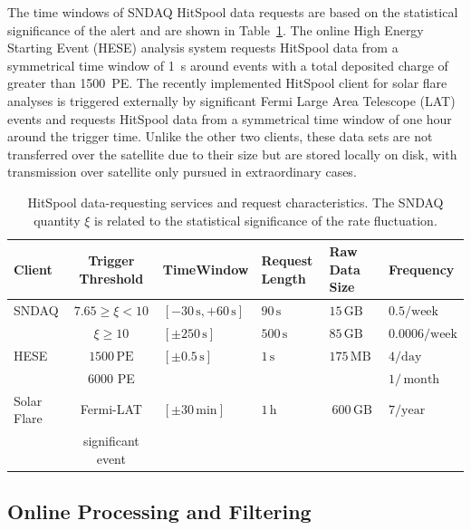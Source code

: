 The time windows of SNDAQ HitSpool data requests are based on the
statistical significance of the alert and are shown in
Table~\ref{tab:hsclients}. The online High Energy Starting Event (HESE) 
analysis system requests HitSpool data from a symmetrical time window of
1~s around events with a total deposited charge of greater than 1500~PE.
The recently implemented HitSpool client for solar flare analyses is
triggered externally by significant Fermi Large Area Telescope (LAT) events
and requests HitSpool 
data from a symmetrical time window of one hour around the trigger
time. Unlike the other two clients, these data sets are not transferred
over the satellite due to their size but are stored locally on disk, with
transmission over satellite only pursued in extraordinary cases.

\begin{table}
  \caption{HitSpool data-requesting services and request characteristics.
    The SNDAQ quantity $\xi$ is related to the statistical significance of
    the rate fluctuation.}
  \centering
  \footnotesize
\begin{tabularx}{\textwidth}{lcXXXX}
  \toprule Client & Trigger Threshold & Time\newline Window & Request
  Length & Raw \newline Data Size & Frequency \\
  \midrule
  SNDAQ & $7.65 \ge \xi < 10$  & $[-30\,\mathrm{s},+60\,\mathrm{s}]$ &
  $90 \,\mathrm{s}$& $15 \,\mathrm{GB}$&
  $0.5/\mathrm{week}$ \\
   & $\xi \ge 10$ &  $[\pm250\,\mathrm{s}]$ & $500\,\mathrm{s}$ & $85
  \,\mathrm{GB}$ & $0.0006 / \mathrm{week}$ \\
  HESE & $1500 \,\mathrm{PE} $ &
  $[\pm0.5\,\mathrm{s}]$& $1\,\mathrm{s}$ & $175\,\mathrm{MB}$ &
  $4/\mathrm{day}$ \\
   & 6000 PE & & & & $1/\,\mathrm{month}$ \\ 
  Solar Flare & Fermi-LAT & $[\pm30\,\mathrm{min}]$ & $1\,\mathrm{h}$&
  $~600\,\mathrm{GB}$& $ 7 / \mathrm{year}$ \\
  & significant event & & & & 
  \\ \bottomrule
\end{tabularx}
\label{tab:hsclients}
\end{table}

\subsection{\label{sect:online:filter}Online Processing and Filtering}

